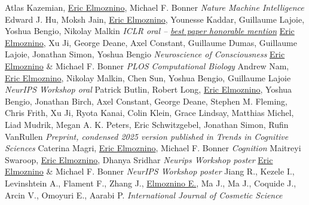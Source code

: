 \documentclass[letterpaper]{twentysecondcv} %
\begin{document}
\begin{pub}
	              {Atlas Kazemian, \underline{Eric Elmoznino}, Michael F. Bonner \textit{Nature Machine Intelligence}}
	              {Edward J. Hu, Moksh Jain, \underline{Eric Elmoznino}, Younesse Kaddar, Guillaume Lajoie, Yoshua Bengio, Nikolay Malkin \textit{ICLR oral -- \underline{best paper honorable mention}}}
	              {\underline{Eric Elmoznino}, Xu Ji, George Deane, Axel Constant, Guillaume Dumas, Guillaume Lajoie, Jonathan Simon, Yoshua Bengio \textit{Neuroscience of Consciousness}}
	              {\underline{Eric Elmoznino} \& Michael F. Bonner \textit{PLOS Computational Biology}}
	              {Andrew Nam, \underline{Eric Elmoznino}, Nikolay Malkin, Chen Sun, Yoshua Bengio, Guillaume Lajoie \textit{NeurIPS Workshop oral}}
	              {Patrick Butlin, Robert Long, \underline{Eric Elmoznino}, Yoshua Bengio, Jonathan Birch, Axel Constant, George Deane, Stephen M. Fleming, Chris Frith, Xu Ji, Ryota Kanai, Colin Klein, Grace Lindsay, Matthias Michel, Liad Mudrik, Megan A. K. Peters, Eric Schwitzgebel, Jonathan Simon, Rufin VanRullen \textit{Preprint, condensed 2025 version published in Trends in Cognitive Sciences}}
	              {Caterina Magri, \underline{Eric Elmoznino}, Michael F. Bonner \textit{Cognition}}
	              {Maitreyi Swaroop, \underline{Eric Elmoznino}, Dhanya Sridhar \textit{Neurips Workshop poster}}
	              {\underline{Eric Elmoznino} \& Michael F. Bonner \textit{NeurIPS Workshop poster}}
	              {Jiang R., Kezele I.,  Levinshtein A., Flament F., Zhang J., \underline{Elmoznino E.}, Ma J., Ma J., Coquide J., Arcin V., Omoyuri E., Aarabi P. \textit{International Journal of Cosmetic Science}}
\end{pub}
\end{document}
